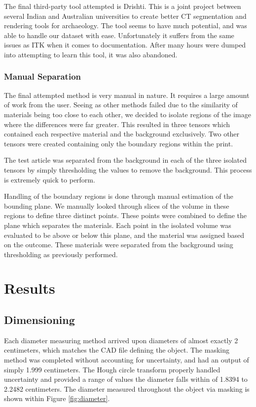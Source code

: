 \documentclass[11pt, letterpaper]{article}
\begin{document}
        The final third-party tool attempted is Drishti. This is a joint project between several Indian and Australian universities to create better CT segmentation and rendering tools for archaeology. The tool seems to have much potential, and was able to handle our dataset with ease. Unfortunately it suffers from the same issues as ITK when it comes to documentation. After many hours were dumped into attempting to learn this tool, it was also abandoned.

    \subsubsection{Manual Separation}
        The final attempted method is very manual in nature. It requires a large amount of work from the user. Seeing as other methods failed due to the similarity of materials being too close to each other, we decided to isolate regions of the image where the differences were far greater. This resulted in three tensors which contained each respective material and the background exclusively. Two other tensors were created containing only the boundary regions within the print.

        The test article was separated from the background in each of the three isolated tensors by simply thresholding the values to remove the background. This process is extremely quick to perform.

        Handling of the boundary regions is done through manual estimation of the bounding plane. We manually looked through slices of the volume in these regions to define three distinct points. These points were combined to define the plane which separates the materials. Each point in the isolated volume was evaluated to be above or below this plane, and the material was assigned based on the outcome. These materials were separated from the background using thresholding as previously performed.

\section{Results}
\subsection{Dimensioning}
    Each diameter measuring method arrived upon diameters of almost exactly 2 centimeters, which matches the CAD file defining the object. The masking method was completed without accounting for uncertainty, and had an output of simply 1.999 centimeters. The Hough circle transform properly handled uncertainty and provided a range of values the diameter falls within of 1.8394 to 2.2482 centimeters. The diameter measured throughout the object via masking is shown within Figure \ref{fig:diameter}.
\end{document}
